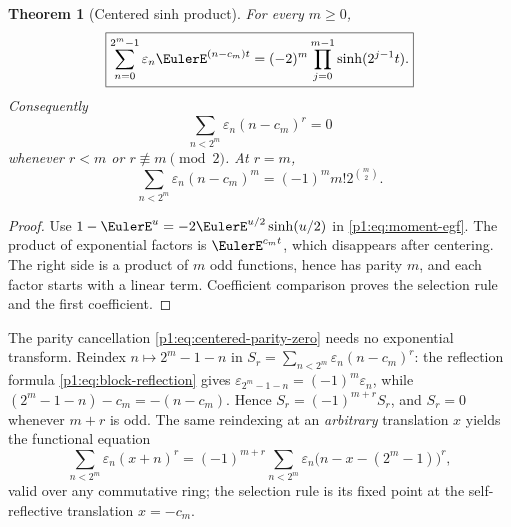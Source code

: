 \documentclass[11pt,oneside]{article}
\numberwithin{equation}{section}
\newtheorem{theorem}{Theorem}[section]
\theoremstyle{definition}
\theoremstyle{remark}
\newcommand{\eps}{\varepsilon}
\begin{document}
\begin{theorem}[Centered sinh product]
\label{p1:thm:centered-sinh}
For every \(m\ge0\),
\begin{equation}
  \boxed{
  \sum_{n=0}^{2^m-1}\eps_n\EulerE^{(n-c_m)t}
  =(-2)^m\prod_{j=0}^{m-1}\sinh(2^{j-1}t).}
  \label{p1:eq:centered-sinh}
\end{equation}
Consequently
\begin{equation}
  \boxed{
  \sum_{n<2^m}\eps_n(n-c_m)^r=0}
  \label{p1:eq:centered-parity-zero}
\end{equation}
whenever \(r<m\) or \(r\not\equiv m\pmod2\).  At \(r=m\),
\begin{equation}
  \sum_{n<2^m}\eps_n(n-c_m)^m
  =(-1)^mm!2^{\binom m2}.
  \label{p1:eq:centered-first}
\end{equation}
\end{theorem}

\begin{proof}
Use
\(1-\EulerE^u=-2\EulerE^{u/2}\sinh(u/2)\) in
\eqref{p1:eq:moment-egf}.  The product of exponential factors is
\(\EulerE^{c_mt}\), which disappears after centering.  The right side is a product
of \(m\) odd functions, hence has parity \(m\), and each factor starts with a
linear term.  Coefficient comparison proves the selection rule and the first
coefficient.
\end{proof}

\begin{remark}
\label{p1:rem:reflection-parity}
The parity cancellation \eqref{p1:eq:centered-parity-zero} needs no
exponential transform.  Reindex \(n\mapsto2^m-1-n\) in
\(S_r=\sum_{n<2^m}\eps_n(n-c_m)^r\): the reflection formula
\eqref{p1:eq:block-reflection} gives \(\eps_{2^m-1-n}=(-1)^m\eps_n\),
while \((2^m-1-n)-c_m=-(n-c_m)\).  Hence \(S_r=(-1)^{m+r}S_r\), and
\(S_r=0\) whenever \(m+r\) is odd.  The same reindexing at an
\emph{arbitrary} translation \(x\) yields the functional equation
\[
 \sum_{n<2^m}\eps_n(x+n)^r
 =(-1)^{m+r}\sum_{n<2^m}\eps_n\bigl(n-x-(2^m-1)\bigr)^r,
\]
valid over any commutative ring; the selection rule is its fixed point at
the self-reflective translation \(x=-c_m\).
\end{remark}
\end{document}
